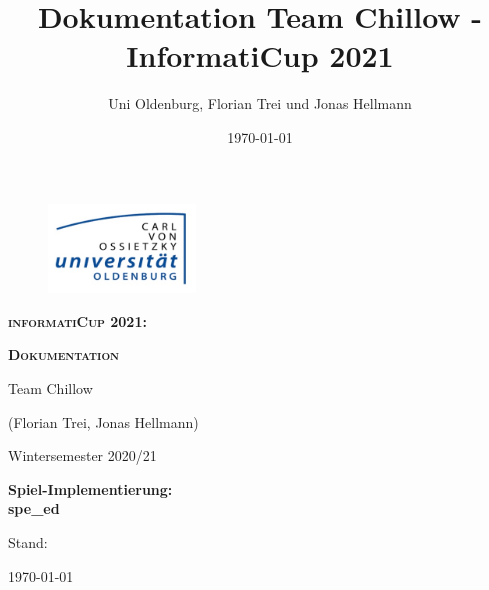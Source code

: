 \documentclass[xcolor=dvipsnames,12pt,a4paper,oneside]{book}
\author{Uni Oldenburg, Florian Trei und Jonas Hellmann}
\date{\today}
\title{Dokumentation Team Chillow - InformatiCup 2021}
\begin{document}
\lstset{language=Python}

\begin{titlepage}
\pagestyle{empty}
\begin{center}


\begin{figure}[H]
\centering
\includegraphics[width=0.35\textwidth]{Logo.jpg}
\end{figure}

\bigskip \bigskip \noindent
\textsc{\textbf{\LARGE informatiCup 2021:}} \par \bigskip \noindent
\textsc{\textbf{\LARGE Dokumentation}}


\par \bigskip \bigskip \bigskip \bigskip \bigskip \noindent
{\Large Team Chillow} \par \medskip \noindent
{\Large (Florian Trei, Jonas Hellmann)} \par \medskip \noindent




\par \bigskip \bigskip \bigskip \bigskip \bigskip \bigskip \noindent
\begin{center} \Large Wintersemester 2020/21 \end{center}


\par \bigskip \bigskip \bigskip \bigskip \bigskip \bigskip \noindent
\textsf{\textbf{Spiel-Implementierung:\\spe\_ed}} \par \noindent
\textsf{\textbf{}}\par
\bigskip


\bigskip\bigskip\bigskip\bigskip\bigskip\noindent
Stand:\par\noindent
\today


\end{center}
\end{titlepage}



\tableofcontents
\clearpage
\end{document}
